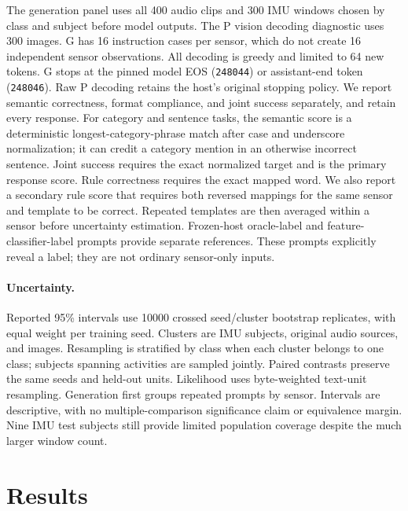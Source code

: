 \documentclass[11pt]{article}
\begin{document}
The generation panel uses all 400 audio clips and 300 IMU windows chosen by
class and subject before model outputs. The P vision decoding diagnostic uses
300 images. G has 16 instruction cases per sensor, which do not create 16
independent sensor observations. All decoding is greedy and limited to 64 new
tokens. G stops at the pinned model EOS (\texttt{248044}) or assistant-end
token (\texttt{248046}). Raw P decoding retains the host's original stopping
policy. We report semantic correctness, format compliance, and joint success
separately, and retain every response. For category and sentence tasks, the
semantic score is a deterministic longest-category-phrase match after case and
underscore normalization; it can credit a category mention in an otherwise
incorrect sentence. Joint success requires the exact normalized target and is
the primary response score. Rule correctness requires the exact mapped word.
We also report a secondary rule score that requires both reversed mappings for
the same sensor and template to be correct. Repeated templates are then
averaged within a sensor before uncertainty estimation.
Frozen-host oracle-label and
feature-classifier-label prompts provide separate references. These prompts
explicitly reveal a label; they are not ordinary sensor-only inputs.

\paragraph{Uncertainty.}
Reported 95\% intervals use 10000 crossed seed/cluster bootstrap replicates,
with equal weight per training seed. Clusters are IMU subjects, original audio
sources, and images. Resampling is stratified by class when each cluster
belongs to one class; subjects spanning activities are sampled jointly.
Paired contrasts preserve the same seeds and held-out units. Likelihood uses
byte-weighted text-unit resampling. Generation first groups repeated prompts
by sensor. Intervals are descriptive, with no multiple-comparison significance
claim or equivalence margin. Nine IMU test subjects still provide limited
population coverage despite the much larger window count.

\section{Results}

\end{document}
